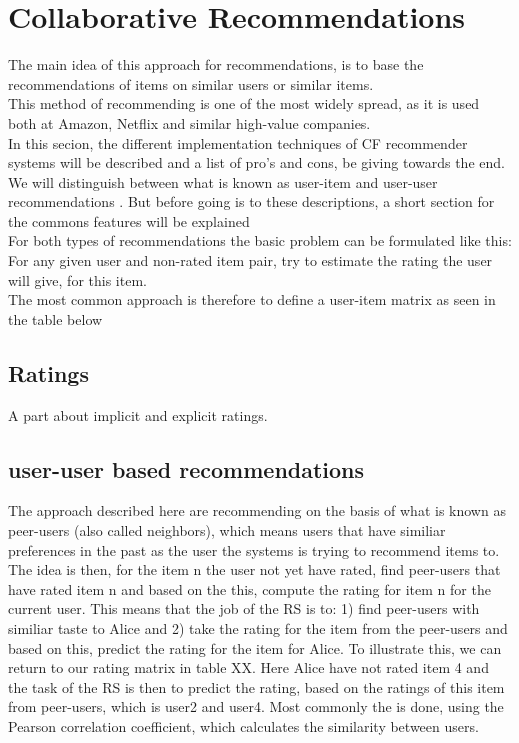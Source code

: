 \section{Collaborative Recommendations}
\label{sub:basic_collaborative_recommendations}
The main idea of this approach for recommendations, is to base the recommendations of items on similar users or similar items.\\
This method of recommending is one of the most widely spread, as it is used both at Amazon, Netflix and similar high-value companies.\\
In this secion, the different implementation techniques of CF recommender systems will be described and a list of pro's and cons, be giving towards the end. We will distinguish between what is known as user-item and user-user recommendations . But before going is to these descriptions, a short section for the commons features will be explained\\

For both types of recommendations the basic problem can be formulated like this: For any given user and non-rated item pair, try to estimate the rating the user will give, for this item.\\
The most common approach is therefore to define a user-item matrix as seen in the table below 

\subsection{Ratings} %
\label{sub:ratings}
A part about implicit and explicit ratings.

\subsection{user-user based recommendations} %
\label{sub:user_user_based_recommendations}
The approach described here are recommending on the basis of what is known as peer-users (also called neighbors), which means users that have similiar preferences in the past as the user the systems is trying to recommend items to. The idea is then, for the item n the user not yet have rated, find peer-users that have rated item n and based on the this, compute the rating for item n for the current user. This means that the job of the RS is to: 1) find peer-users with similiar taste to Alice and 2) take the rating for the item from the peer-users and based on this, predict the rating for the item for Alice.
To illustrate this, we can return to our rating matrix in table XX. Here Alice have not rated item 4 and the task of the RS is then to predict the rating, based on the ratings of this item from peer-users, which is user2 and user4. Most commonly the is done, using the Pearson correlation coefficient, which calculates the similarity between users.

